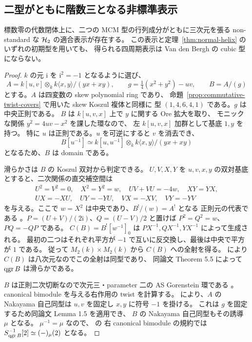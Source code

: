 \subsection{二型がともに階数三となる非標準表示}
\label{sec:rank-three-example}

\begin{proposition}
\label{prop:nonstandard-rank-three-example}
標数零の代数閉体上に、二つの MCM 型の行列成分がともに三次元を張る
non-standard な $\mathcal H_2$ の適合表示が存在する。
この表示と定理~\ref{thm:normal-helix} のいずれの初期型を用いても、
得られる四周期表示は Van den Bergh の cubic 型にならない。
\end{proposition}

\begin{proof}
$k$ の元 $\mathrm i$ を $\mathrm i^2=-1$ となるように選び、
\[
 A=k[u,v]\otimes_k k\langle x,y\rangle/(yx+xy),\qquad
 g=\tfrac14(x^2+y^2)-uv,\qquad B=A/(g)
\]
とする。$A$ は四変数の skew polynomial ring であり、
命題~\ref{prop:commutative-twist-covers} で用いた skew Koszul 複体と同様に
型 $(1,4,6,4,1)$ である。$g$ は中央正則である。
$B$ は $k[u,v,x]$ 上で $y$ に関する Ore 拡大を取り、
モニックな関係 $y^2=4uv-x^2$ を課した環なので、
左 $k[u,v,x]$ 加群として基底 $1,y$ を持つ。
特に $u$ は正則である。$u$ を可逆にすると $v$ を消去でき、
\[
 B[u^{-1}]\simeq k[u,u^{-1}]\otimes_k k\langle x,y\rangle/(yx+xy)
\]
となるため、$B$ は domain である。

滑らかさは $B$ の Koszul 双対から判定できる。
$U,V,X,Y$ を $u,v,x,y$ の双対基底とすると、二次関係の直交補空間は
\[
\begin{gathered}
 U^2=V^2=0,\quad X^2=Y^2=w,\quad UV+VU=-4w,\quad XY=YX,\\
 UX=-XU,\quad UY=-YU,\quad VX=-XV,\quad VY=-YV
\end{gathered}
\]
を与える。ここで $w=X^2$ は中央であり、$B^!/(w)=A^!$ となる
正則元の代表である \cite[Lemma 4.11(2)]{MU2022}。$P=(U+V)/(2\mathrm i)$、$Q=(U-V)/2$ と置けば
$P^2=Q^2=w$、$PQ=-QP$ である。
$C(B)=B^![w^{-1}]_0$ は $P X^{-1},Q X^{-1},Y X^{-1}$ によって生成される。
最初の二つはそれぞれ平方が $-1$ で互いに反交換し、最後は中央で平方が $1$ である。
従って $M_2(k)\times M_2(k)$ から $C(B)$ への全射を得る。
\cite[Lemma 4.13(1)]{MU2022} により $C(B)$ は八次元なのでこの全射は同型であり、
同論文 Theorem 5.5 によって $\operatorname{qgr} B$ は滑らかである。

$B$ は正則二次切断なので次元三・parameter 二の AS Gorenstein 環である
\cite[Lemma 2.4]{MU2022}。canonical bimodule を与える右作用の twist を計算する。
\cite[arXiv v2, Example 5.5]{RRZ2014} により、$A$ の Nakayama 自己同型は
$u,v$ を固定し $x,y$ に符号 $-1$ を掛ける。
これは $g$ を固定するため同論文 Lemma 1.5 を適用でき、
$B$ の Nakayama 自己同型もその誘導 $\mu$ となる。
$\mu^{-1}=\mu$ なので、\cite[Example 3.6(2)]{MU2021} の
右 canonical bimodule の規約では
$S_{\operatorname{qgr} B}^{-1}[2]\simeq(-)_\mu(2)$ となる。


\end{proof}
